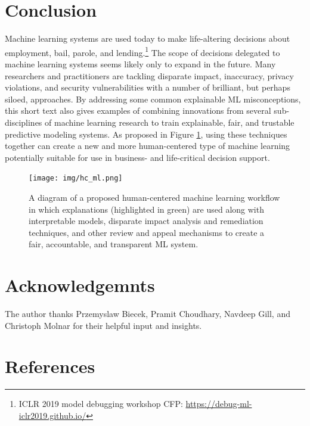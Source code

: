 \documentclass[fleqn]{article}
\begin{document}
\section*{Conclusion}

Machine learning systems are used today to make life-altering decisions about employment, bail, parole, and lending.\footnote{ICLR 2019 model debugging workshop CFP: \url{https://debug-ml-iclr2019.github.io/}} The scope of decisions delegated to machine learning systems seems likely only to expand in the future. Many researchers and practitioners are tackling disparate impact, inaccuracy, privacy violations, and security vulnerabilities with a number of brilliant, but perhaps siloed, approaches. By addressing some common explainable ML misconceptions, this short text also gives examples of combining innovations from several sub-disciplines of machine learning research to train explainable, fair, and trustable predictive modeling systems. As proposed in Figure \ref{fig:hc_ml}, using these techniques together can create a new and more human-centered type of machine learning potentially suitable for use in business- and life-critical decision support.\\

\vspace{100pt}

\begin{figure}[htb!]
	\begin{center}
		\texttt{[image: img/hc\_ml.png]}
		\caption{A diagram of a proposed human-centered machine learning workflow in which explanations (highlighted in green) are used along with interpretable models, disparate impact analysis and remediation techniques, and other review and appeal mechanisms to create a fair, accountable, and transparent ML system.}
		\label{fig:hc_ml}
	\end{center}
\end{figure}

\section*{Acknowledgemnts}

The author thanks Przemyslaw Biecek, Pramit Choudhary, Navdeep Gill, and Christoph Molnar for their helpful input and insights. 

\section*{References}
\small


\end{document}

